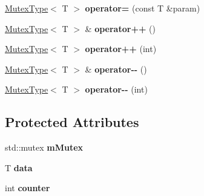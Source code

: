 \begin{DoxyCompactItemize}
\item 
\hypertarget{classpersonal_robotics_1_1_mutex_type_a92a364c6fa77d00dbed0cf354c9e7cc5}{}\hyperlink{classpersonal_robotics_1_1_mutex_type}{Mutex\+Type}$<$ T $>$ {\bfseries operator=} (const T \&param)\label{classpersonal_robotics_1_1_mutex_type_a92a364c6fa77d00dbed0cf354c9e7cc5}

\item 
\hypertarget{classpersonal_robotics_1_1_mutex_type_a278e5a2c4c6263af9b039dfa8d303cf6}{}\hyperlink{classpersonal_robotics_1_1_mutex_type}{Mutex\+Type}$<$ T $>$ \& {\bfseries operator++} ()\label{classpersonal_robotics_1_1_mutex_type_a278e5a2c4c6263af9b039dfa8d303cf6}

\item 
\hypertarget{classpersonal_robotics_1_1_mutex_type_a639e349d4ea67bab3ed94f941575947b}{}\hyperlink{classpersonal_robotics_1_1_mutex_type}{Mutex\+Type}$<$ T $>$ {\bfseries operator++} (int)\label{classpersonal_robotics_1_1_mutex_type_a639e349d4ea67bab3ed94f941575947b}

\item 
\hypertarget{classpersonal_robotics_1_1_mutex_type_a38733878568858e12647d40f99b8b917}{}\hyperlink{classpersonal_robotics_1_1_mutex_type}{Mutex\+Type}$<$ T $>$ \& {\bfseries operator-\/-\/} ()\label{classpersonal_robotics_1_1_mutex_type_a38733878568858e12647d40f99b8b917}

\item 
\hypertarget{classpersonal_robotics_1_1_mutex_type_a95abe111d6ca61a73f8ae6191aada780}{}\hyperlink{classpersonal_robotics_1_1_mutex_type}{Mutex\+Type}$<$ T $>$ {\bfseries operator-\/-\/} (int)\label{classpersonal_robotics_1_1_mutex_type_a95abe111d6ca61a73f8ae6191aada780}

\end{DoxyCompactItemize}
\subsection*{Protected Attributes}
\begin{DoxyCompactItemize}
\item 
\hypertarget{classpersonal_robotics_1_1_mutex_type_a151eabd8d0e9cb3ce6d9f214a298925f}{}std\+::mutex {\bfseries m\+Mutex}\label{classpersonal_robotics_1_1_mutex_type_a151eabd8d0e9cb3ce6d9f214a298925f}

\item 
\hypertarget{classpersonal_robotics_1_1_mutex_type_aca8750364cc6626b9409664693dc683c}{}T {\bfseries data}\label{classpersonal_robotics_1_1_mutex_type_aca8750364cc6626b9409664693dc683c}

\item 
\hypertarget{classpersonal_robotics_1_1_mutex_type_a96b021c61e62fe3d82a190dc6b5652fd}{}int {\bfseries counter}\label{classpersonal_robotics_1_1_mutex_type_a96b021c61e62fe3d82a190dc6b5652fd}

\end{DoxyCompactItemize}


